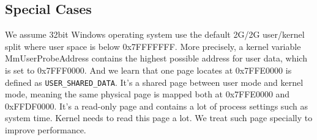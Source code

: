 

\subsection{Special Cases}
We assume 32bit Windows operating system use the default 2G/2G user/kernel split where user space is below 0x7FFFFFFF. More precisely, a kernel variable MmUserProbeAddress contains the highest possible address for user data, which is set to 0x7FFF0000. And we learn that one page locates at 0x7FFE0000 is defined as \texttt{USER\_SHARED\_DATA}. It's a shared page between user mode and kernel mode, meaning the same physical page is mapped both at 0x7FFE0000 and 0xFFDF0000. It's a read-only page and contains a lot of process settings such as system time. Kernel needs to read this page a lot. We treat such page specially to improve performance. 


